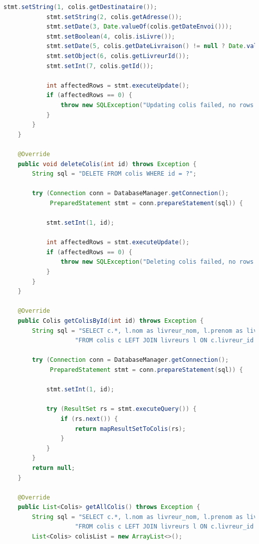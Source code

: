\documentclass{rapportENSIAS}
\begin{document}
\begin{lstlisting}[language=Java, caption=Impl\'{e}mentation ColisDAOImpl compl\`{e}te]
            stmt.setString(1, colis.getDestinataire());
            stmt.setString(2, colis.getAdresse());
            stmt.setDate(3, Date.valueOf(colis.getDateEnvoi()));
            stmt.setBoolean(4, colis.isLivre());
            stmt.setDate(5, colis.getDateLivraison() != null ? Date.valueOf(colis.getDateLivraison()) : null);
            stmt.setObject(6, colis.getLivreurId());
            stmt.setInt(7, colis.getId());
            
            int affectedRows = stmt.executeUpdate();
            if (affectedRows == 0) {
                throw new SQLException("Updating colis failed, no rows affected.");
            }
        }
    }
    
    @Override
    public void deleteColis(int id) throws Exception {
        String sql = "DELETE FROM colis WHERE id = ?";
        
        try (Connection conn = DatabaseManager.getConnection();
             PreparedStatement stmt = conn.prepareStatement(sql)) {
            
            stmt.setInt(1, id);
            
            int affectedRows = stmt.executeUpdate();
            if (affectedRows == 0) {
                throw new SQLException("Deleting colis failed, no rows affected.");
            }
        }
    }
    
    @Override
    public Colis getColisById(int id) throws Exception {
        String sql = "SELECT c.*, l.nom as livreur_nom, l.prenom as livreur_prenom, l.telephone as livreur_telephone " +
                    "FROM colis c LEFT JOIN livreurs l ON c.livreur_id = l.id WHERE c.id = ?";
        
        try (Connection conn = DatabaseManager.getConnection();
             PreparedStatement stmt = conn.prepareStatement(sql)) {
            
            stmt.setInt(1, id);
            
            try (ResultSet rs = stmt.executeQuery()) {
                if (rs.next()) {
                    return mapResultSetToColis(rs);
                }
            }
        }
        return null;
    }
    
    @Override
    public List<Colis> getAllColis() throws Exception {
        String sql = "SELECT c.*, l.nom as livreur_nom, l.prenom as livreur_prenom, l.telephone as livreur_telephone " +
                    "FROM colis c LEFT JOIN livreurs l ON c.livreur_id = l.id ORDER BY c.dateEnvoi DESC";
        List<Colis> colisList = new ArrayList<>();
        

\end{lstlisting}
\end{document}
